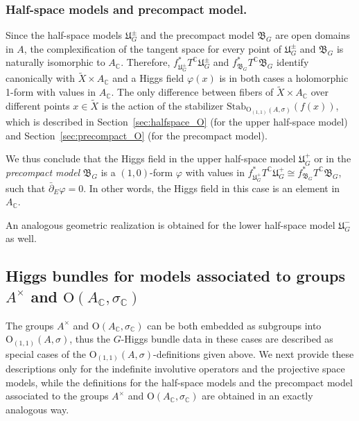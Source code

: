 \documentclass[oneside,11pt]{amsart}
\theoremstyle{definition}
\theoremstyle{remark}
\numberwithin{thm}{section}
\numberwithin{equation}{section}
\begin{document}
\subsubsection{Half-space models and precompact model.} Since the half-space models $\mathfrak U^{\pm}_G$ and the precompact model $\mathfrak{B}_G$ are open domains in $A$, the complexification of the tangent space for every point of $\mathfrak U^{\pm}_G$ and $\mathfrak{B}_G$ is naturally isomorphic to  $A_\mathbb C$. Therefore, $f^*_{\mathfrak U^{\pm}_G} T^\mathbb C\mathfrak U^{\pm}_G$ and $f^*_{\mathfrak{B}_G} T^\mathbb C\mathfrak{B}_G$ identify canonically with $\tilde X\times A_\mathbb C$ and a Higgs field $\varphi(x)$ is in both cases a holomorphic 1-form with values in $A_\mathbb C$. The only difference between fibers of $\tilde X\times  A_\mathbb C$ over different points $x\in\tilde X$ is the action of the stabilizer $\mathrm{Stab}_{\mathrm{O}_{(1,1)}(A,\sigma)}(f(x))$, which is described in Section~\ref{sec:halfspace_O} (for the  upper half-space model) and Section~\ref{sec:precompact_O} (for the precompact model). 

We thus conclude that the Higgs field in the upper half-space model $\mathfrak U^+_G$ or in the \emph{precompact model} $\mathfrak{B}_G$ is a $(1,0)$-form $\varphi$ with values in $f_{\mathfrak{U}^+_G}^*T^\mathbb{C}\mathfrak{U}^+_G \cong  f_{\mathfrak{B}_G}^*T^\mathbb{C}\mathfrak{B}_G$, such that $\bar\partial_E \varphi =0$. In other words, the Higgs field in this case is an element in $A_{\mathbb{C}}$.

An analogous geometric realization is obtained for the lower half-space model $\mathfrak{U}_G^-$ as well.

\subsection{Higgs bundles for models associated to groups  \texorpdfstring{$A^{\times}$ and $\mathrm{O}(A_{\mathbb{C}}, \sigma_{\mathbb{C}})$}{}}

The groups $A^{\times}$ and $\mathrm{O}(A_{\mathbb{C}}, \sigma_{\mathbb{C}})$ can be both embedded as subgroups into $\mathrm{O}_{(1,1)}(A,\sigma)$, thus the $G$-Higgs bundle data in these cases are described as special cases of the $\mathrm{O}_{(1,1)}(A,\sigma)$-definitions given above. We next provide these descriptions only for the indefinite involutive operators and the projective space models, while the 
definitions for the half-space models and the precompact model associated to the groups $A^{\times}$ and $\mathrm{O}(A_{\mathbb{C}}, \sigma_{\mathbb{C}})$ are obtained in an exactly analogous way.
\end{document}
